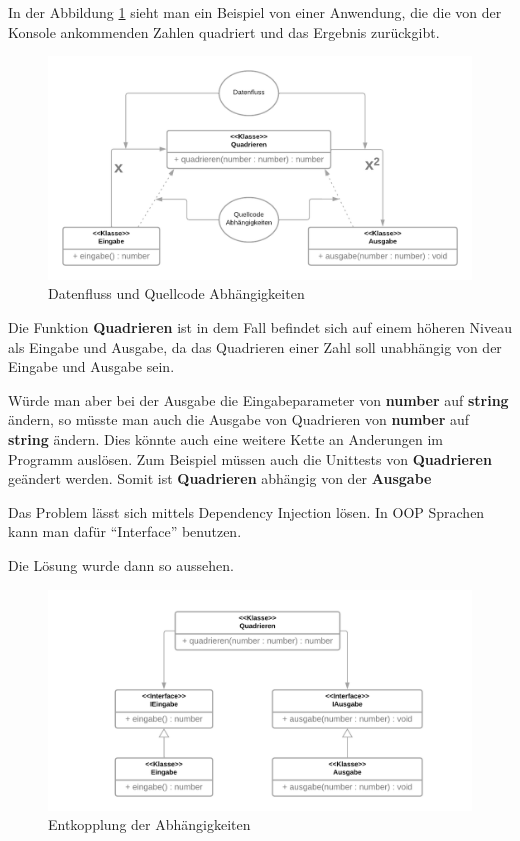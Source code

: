In der Abbildung \ref{fig:dateflowVScodedep} sieht man ein Beispiel von einer Anwendung, die die von der Konsole ankommenden Zahlen quadriert und das Ergebnis zurückgibt.
                
\begin{figure}[H]
    \centering
    \includegraphics[width=1\textwidth]{./images/DepInj_1.png}
    \caption{Datenfluss und Quellcode Abhängigkeiten}
    \label{fig:dateflowVScodedep}
\end{figure}

Die Funktion \textbf{Quadrieren} ist in dem Fall befindet sich auf einem höheren Niveau als Eingabe und Ausgabe, 
da das Quadrieren einer Zahl soll unabhängig von der Eingabe und Ausgabe sein.

Würde man aber bei der Ausgabe die Eingabeparameter von \textbf{number} auf \textbf{string} ändern, 
so müsste man auch die Ausgabe von Quadrieren von \textbf{number} auf \textbf{string} ändern.
Dies könnte auch eine weitere Kette an Anderungen im Programm auslösen. 
Zum Beispiel müssen auch die Unittests von \textbf{Quadrieren} geändert werden.
Somit ist \textbf{Quadrieren} abhängig von der \textbf{Ausgabe}

Das Problem lässt sich mittels Dependency Injection lösen.
In OOP Sprachen kann man dafür ``Interface'' benutzen.

Die Lösung wurde dann so aussehen. 
\begin{figure}[H]
    \centering
    \includegraphics[width=1\textwidth]{./images/DepInj_2.png}
    \caption{Entkopplung der Abhängigkeiten}
    \label{fig:flow around cylinder}
\end{figure}

